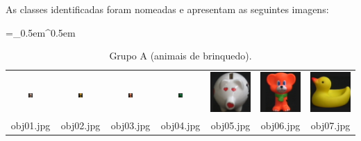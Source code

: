 As classes identificadas foram nomeadas e apresentam as seguintes imagens:

\begin{table}[H]
  \centering
  \caption{Grupo A (animais de brinquedo).}
  \tabulinesep =_0.5em^0.5em
  \everyrow{\tabucline[0.4pt]-}
  \begin{tabu}{|ccccccc|}
    \includegraphics[width=0.1\textwidth,height=0.1\textwidth]{imagens/coil_100/animais_brinquedos/obj14__0.png} &
    \includegraphics[width=0.1\textwidth,height=0.1\textwidth]{imagens/coil_100/animais_brinquedos/obj17__0.png} &
    \includegraphics[width=0.1\textwidth,height=0.1\textwidth]{imagens/coil_100/animais_brinquedos/obj20__0.png} &
    \includegraphics[width=0.1\textwidth,height=0.1\textwidth]{imagens/coil_100/animais_brinquedos/obj28__275.png} &
    \includegraphics[width=0.1\linewidth,height=0.1\linewidth]{imagens/coil_100/animais_brinquedos/obj48__265.png} &
    \includegraphics[width=0.1\linewidth,height=0.1\linewidth]{imagens/coil_100/animais_brinquedos/obj52__0.png} &
    \includegraphics[width=0.1\linewidth,height=0.1\linewidth]{imagens/coil_100/animais_brinquedos/obj74__0.png}
    \\
    \scriptsize{obj01.jpg} & \scriptsize{obj02.jpg} & \scriptsize{obj03.jpg} &
    \scriptsize{obj04.jpg} & \scriptsize{obj05.jpg} & \scriptsize{obj06.jpg} &
    \scriptsize{obj07.jpg}
  \end{tabu}
\end{table}

